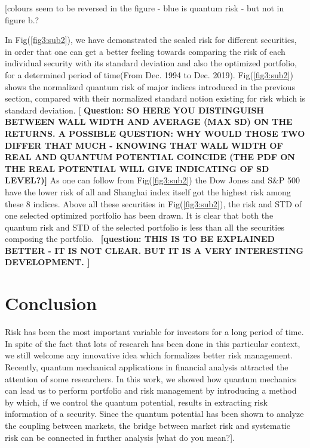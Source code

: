 \documentclass[ aip,jmp,reprint]{revtex4-2}
\begin{document}
[colours seem to be reversed in the figure - blue is quantum risk - but not
in figure b.?

In Fig(\ref{fig3:sub2}), we have demonstrated the scaled risk for different
securities, in order that one can get a better feeling towards comparing the
risk of each individual security with its standard deviation and also the
optimized portfolio, for a determined period of time(From Dec. 1994 to Dec.
2019). Fig(\ref{fig3:sub2}) shows the normalized quantum risk of major
indices introduced in the previous section, compared with their normalized
standard notion existing for risk which is standard deviation. [\textbf{%
Question: SO HERE YOU DISTINGUISH BETWEEN WALL WIDTH AND AVERAGE (MAX SD) ON
THE RETURNS. A POSSIBLE QUESTION: WHY WOULD THOSE TWO DIFFER THAT MUCH -
KNOWING THAT WALL WIDTH OF REAL AND QUANTUM POTENTIAL COINCIDE (THE PDF ON
THE REAL POTENTIAL WILL GIVE INDICATING OF SD LEVEL?)] }As one can follow
from Fig(\ref{fig3:sub2}) the Dow Jones and S\&P 500 have the lower risk of
all and Shanghai index itself got the highest risk among these 8 indices.
Above all these securities in Fig(\ref{fig3:sub2}), the risk and STD of one
selected optimized portfolio has been drawn. It is clear that both the
quantum risk and STD of the selected portfolio is less than all the
securities composing the portfolio. \ \textbf{[question: THIS IS TO BE
EXPLAINED BETTER - IT IS NOT CLEAR. BUT IT IS A VERY INTERESTING
DEVELOPMENT. ]}

\newpage

\section{Conclusion}

Risk has been the most important variable for investors for a long period of
time. In spite of the fact that lots of research has been done in this
particular context, we still welcome any innovative idea which formalizes
better risk management. Recently, quantum mechanical applications in
financial analysis attracted the attention of some researchers. In this
work, we showed how quantum mechanics can lead us to perform portfolio and
risk management by introducing a method by which, if we control the quantum
potential, results in extracting risk information of a security. Since the
quantum potential has been shown to analyze the coupling between markets,
the bridge between market risk and systematic risk can be connected in
further analysis [what do you mean?].

\newpage
\end{document}
